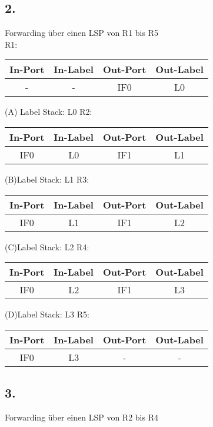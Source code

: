 \documentclass[paper=a4, fontsize=11pt]{scrartcl}
\numberwithin{equation}{section}
\numberwithin{figure}{section}
\numberwithin{table}{section}
\begin{document}
\subsection{2.}
Forwarding über einen LSP von R1 bis R5 \\

R1:\newline
\begin{tabular}{c|c|c|c}
In-Port & In-Label & Out-Port & Out-Label \\\hline
- & - & IF0 & L0\\
\end{tabular}\newline
(A) Label Stack: L0\newline
R2:\newline
\begin{tabular}{c|c|c|c}
In-Port & In-Label & Out-Port & Out-Label \\\hline
IF0 & L0 & IF1 & L1\\
\end{tabular}\newline
(B)Label Stack: L1\newline
R3:\newline
\begin{tabular}{c|c|c|c}
In-Port & In-Label & Out-Port & Out-Label \\\hline
IF0 & L1 & IF1 & L2\\
\end{tabular}\newline
(C)Label Stack: L2\newline
R4:\newline
\begin{tabular}{c|c|c|c}
In-Port & In-Label & Out-Port & Out-Label \\\hline
IF0 & L2 & IF1 & L3\\
\end{tabular}\newline
(D)Label Stack: L3\newline
R5:\newline
\begin{tabular}{c|c|c|c}
In-Port & In-Label & Out-Port & Out-Label \\\hline
IF0 & L3 & - & -\\
\end{tabular}\newline

\subsection{3.}
Forwarding über einen LSP von R2 bis R4
\end{document}
